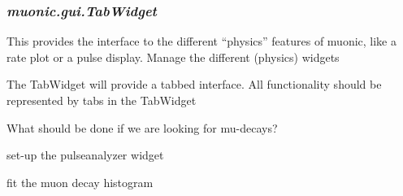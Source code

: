 \documentclass[letterpaper,10pt,english]{sphinxmanual}
\begin{document}
\subsubsection{\emph{muonic.gui.TabWidget}}
\label{muonic:muonic-gui-tabwidget}
This provides the interface to the different ``physics'' features of muonic, like a rate plot or a pulse display.
\label{muonic:module-muonic.gui.TabWidget}
Manage the different (physics) widgets

\begin{fulllineitems}
\label{muonic:muonic.gui.TabWidget.TabWidget}
The TabWidget will provide a tabbed interface.
All functionality should be represented by tabs in the TabWidget

\begin{fulllineitems}
\label{muonic:muonic.gui.TabWidget.TabWidget.activateMuondecayClicked}
What should be done if we are looking for mu-decays?

\end{fulllineitems}


\begin{fulllineitems}
\label{muonic:muonic.gui.TabWidget.TabWidget.activatePulseanalyzerClicked}
set-up the pulseanalyzer widget

\end{fulllineitems}


\begin{fulllineitems}
\label{muonic:muonic.gui.TabWidget.TabWidget.center}
\end{fulllineitems}


\begin{fulllineitems}
\label{muonic:muonic.gui.TabWidget.TabWidget.mufitClicked}
fit the muon decay histogram


\end{fulllineitems}
\end{fulllineitems}
\end{document}
